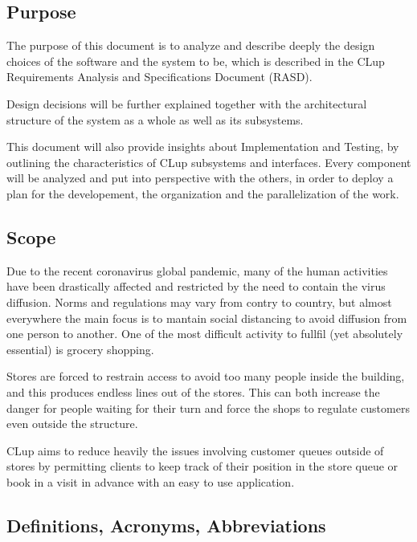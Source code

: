 \subsection{Purpose}
The purpose of this document is to analyze and describe deeply the design choices of the software and the system to be, which is described in the CLup Requirements Analysis and Specifications Document (RASD).

Design decisions will be further explained together with the architectural structure of the system as a whole as well as its subsystems.

\medskip

This document will also provide insights about Implementation and Testing, by outlining the characteristics of CLup subsystems and interfaces. Every component will be analyzed and put into perspective with the others, in order to deploy a plan for the developement, the organization and the parallelization of the work.

\subsection{Scope}

Due to the recent coronavirus global pandemic, many of the human activities have been drastically affected and restricted by the need to contain the virus diffusion. Norms and regulations may vary from contry to country, but almost everywhere the main focus is to mantain social distancing to avoid diffusion from one person to another.
One of the most difficult activity to fullfil (yet absolutely essential) is grocery shopping.
\medskip

Stores are forced to restrain access to avoid too many people inside the building, and this produces endless lines out of the stores. This can both increase the danger for people waiting for their turn and force the shops to regulate customers even outside the structure.

\medskip

CLup aims to reduce heavily the issues involving customer queues outside of stores by permitting clients to keep track of their position in the store queue or book in a visit in advance with an easy to use application.

\clearpage
\subsection{Definitions, Acronyms, Abbreviations}


